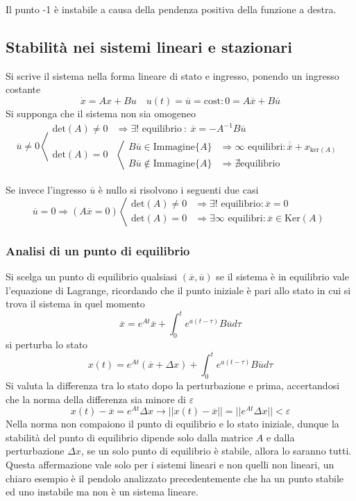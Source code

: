 Il punto -1 è instabile a causa della pendenza positiva della funzione a destra.

\subsection{Stabilità nei sistemi lineari e stazionari}
Si scrive il sistema nella forma lineare di stato e ingresso, ponendo un
ingresso costante
$$
\dot{x} = Ax + Bu\quad u(t)=\overline{u}=\text{cost} :
0=A\overline{x}+B\overline{u}
$$
Si supponga che il sistema non sia omogeneo
$$
\overline{u}\neq0\left\langle
\begin{aligned}
\text{det}(A)\neq 0 &\Rightarrow \exists ! \text{ equilibrio}\ : \
\overline{x}=-A^{-1}B\overline{u} \\
\text{det}(A) = 0 & \left\langle
\begin{aligned}
B\overline{u} \in \text{Immagine}\{A\} &\Rightarrow \infty \text{ equilibri} :
\overline{\overline{x}} + x_{\text{ker}(A)}\\
B\overline{u} \notin \text{Immagine}\{A\} &\Rightarrow \nexists \text{
equilibrio}
\end{aligned}
\right.
\end{aligned}
\right.
$$

Se invece l'ingresso $\overline{u}$ è nullo si risolvono i seguenti due casi
$$
\overline{u}=0\Rightarrow(A\overline{x}=0) \left\langle
\begin{aligned}
\text{det}(A) \neq 0 & \Rightarrow \exists! \text{ equilibrio} :
\overline{x}=0\\
\text{det}(A) = 0 & \Rightarrow \exists \infty \text{ equilibri} :
\overline{x} \in \text{Ker}(A)
\end{aligned}\right.
$$

\newpage
\subsubsection{Analisi di un punto di equilibrio}
Si scelga un punto di equilibrio qualsiasi
$(\overline{x},\overline{u})$ se il sistema è in equilibrio vale l'equazione di
Lagrange, ricordando che il punto iniziale è pari allo stato in cui si trova il
sistema in quel momento
$$
\overline{x} = e^{At} \overline{x} + \int_0^t e^{a(t-\tau)} B\overline{u}d\tau
$$
si perturba lo stato
$$
x(t) = e^{At}(\overline{x}+\Delta x)+ \int_0^t e^{a(t-\tau)} B\overline{u}d\tau
$$
Si valuta la differenza tra lo stato dopo la perturbazione e prima,
accertandosi che la norma della differenza sia minore di $\varepsilon$
$$
x(t)-\overline{x} = e^{At}\Delta x
\longrightarrow ||x(t)-\overline{x}|| =
||e^{At}\Delta x|| < \varepsilon
$$
Nella norma non compaiono il punto di equilibrio e lo stato iniziale, dunque la
stabilità del punto di equilibrio dipende solo dalla matrice $A$ e dalla
perturbazione $\Delta x$, se un solo punto di equilibrio è stabile, allora lo
saranno tutti. Questa affermazione vale solo per i sistemi lineari e non quelli
non lineari, un chiaro esempio è il pendolo analizzato precedentemente che ha
un punto stabile ed uno instabile ma non è un sistema lineare.


